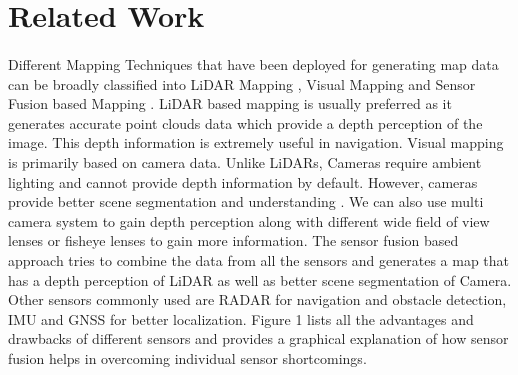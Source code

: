 \documentclass{article}
\begin{document}

	
	\section{Related Work}
		\paragraph{}
		Different Mapping Techniques that have been deployed for generating map data can be broadly classified into 
		LiDAR Mapping
		\cite{levinson_robust_2010},
		Visual Mapping
		\cite{liu_towards_nodate}
		\cite{Krombach_Droeschel_Behnke_2017}
		and Sensor Fusion based Mapping
		\cite{silva_fusion_nodate}. 
		LiDAR based mapping is usually preferred as it generates accurate point clouds data which provide a depth perception of the image. This depth information is extremely useful in navigation. Visual mapping is primarily based on camera data. Unlike LiDARs, Cameras require ambient lighting and cannot provide depth information by default. However, cameras provide better scene segmentation and understanding
		\cite{heng_project_2018}.
		We can also use multi camera system
		\cite{geiger_stereoscan:_2011}
		to gain depth perception along with different wide field of view lenses or fisheye lenses
		\cite{cui_real-time_2018}
		to gain more information.
		The sensor fusion based approach tries to combine the data from all the sensors and generates a map that has a depth perception of LiDAR as well as better scene segmentation of Camera. Other sensors commonly used are RADAR for navigation and obstacle detection, IMU and GNSS for better localization.
		Figure 1 lists all the advantages and drawbacks of different sensors and provides a graphical explanation of how sensor fusion helps in overcoming individual sensor shortcomings.
	
\end{document}
